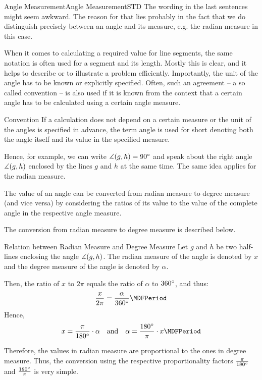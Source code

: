 \begin{MXContent}{Angle Measurement}{Angle Measurement}{STD}
The wording in the last sentences might seem awkward. The reason for that lies probably in the fact
that we do distinguish precisely between an angle and its measure, e.g. the radian measure in this case.

When it comes to calculating a required value for line segments, the same notation is often
used for a segment and its length. Mostly this is clear, and it helps to describe or to illustrate 
a problem efficiently. Importantly, the unit of the angle has to be known or 
explicitly specified. Often, such an agreement -- a so called convention -- is also used if it is 
known from the context that a certain angle has to be calculated using a certain angle measure. 

\begin{MXInfo}{Convention}%
If a calculation does not depend on a certain measure or the unit of the angles
is specified in advance, the term angle is used for short denoting both the angle itself and its value in 
the specified measure.


\end{MXInfo}
Hence, for example, we can write $\measuredangle(g,h) = 90^{\circ}$ and speak about the 
right angle $\measuredangle(g,h)$ enclosed by the lines $g$ and $h$ at the same time.
The same idea applies for the radian measure.

The value of an angle can be converted from radian measure to degree measure (and vice versa) by
considering the ratios of its value to the value of the complete angle in the 
respective angle measure. 

The conversion from radian measure to degree measure is described below.

\begin{MXInfo}{Relation between Radian Measure and Degree Measure}
Let $g$ and $h$ be two half-lines enclosing the angle $\measuredangle(g,h)$.
The radian measure of the angle is denoted by $x$ and the degree measure of 
the angle is denoted by $\alpha$.

Then, the ratio of $x$ to $2\pi$ equals the ratio of $\alpha$ to $360^{\circ}$, and thus:
\[
   \frac{x}{2\pi} = \frac{\alpha}{360\MGrad} \MDFPeriod
\]
Hence,
\[
x = \frac{\pi}{180\MGrad} \cdot \alpha %
\quad\text{and}\quad
\alpha = \frac{180\MGrad}{\pi} \cdot x \MDFPeriod
\]
\end{MXInfo}

Therefore, the values in radian measure are proportional to the ones in degree measure.
Thus, the conversion using the respective proportionality factors $\frac{\pi}{180^{\circ}}$ and 
$\frac{180^{\circ}}{\pi}$ is very simple.



\end{MXContent}
